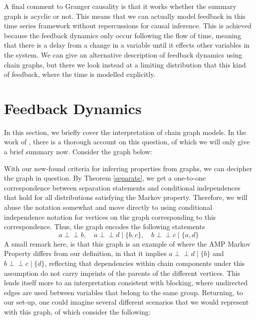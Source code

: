 \documentclass[11pt, a4paper]{memoir}
\theoremstyle{break}
\theoremstyle{break}
\theoremstyle{nonumberplain}
\newcommand{\indep}{\perp \!\!\! \perp}
\begin{document}
A final comment to Granger causality is that it works whether the summary graph is acyclic or not. This means that we can actually model feedback in this time series framework without repercussions for causal inference. This is achieved because the feedback dynamics only occur following the flow of time, meaning that there is a delay from a change in a variable until it effects other variables in the system. We can give an alternative description of feedback dynamics using chain graphs, but there we look instead at a limiting distribution that this kind of feedback, where the time is modelled explicitly.
\section{Feedback Dynamics}
In this section, we briefly cover the interpretation of chain graph models. In the work of \cite{ChainGraph}, there is a thorough account on this question, of which we will only give a brief summary now. Consider the graph below:
\begin{center}
\end{center}
With our new-found criteria for inferring properties from graphs, we can decipher the graph in question. By Theorem \ref{separate}, we get a one-to-one correspondence between separation statements and conditional independences that hold for all distributions satisfying the Markov property. Therefore, we will abuse the notation somewhat and move directly to using conditional independence notation for vertices on the graph corresponding to this correspondence. Thus, the graph encodes the following statements
$$a\indep b,\quad a\indep d\mid \{b,c\},\quad b\indep c\mid \{a,d\}$$
A small remark here, is that this graph is an example of where the AMP Markov Property differs from our definition, in that it implies $a\indep d\mid\{b\}$ and $b\indep c\mid\{d\}$, reflecting that dependencies within chain components under this assumption do not carry imprints of the parents of the different vertices. This lends itself more to an interpretation consistent with blocking, where undirected edges are used between variables that belong to the same group. Returning, to our set-up, one could imagine several different scenarios that we would represent with this graph, of which \cite{ChainGraph} consider the following:
\end{document}
